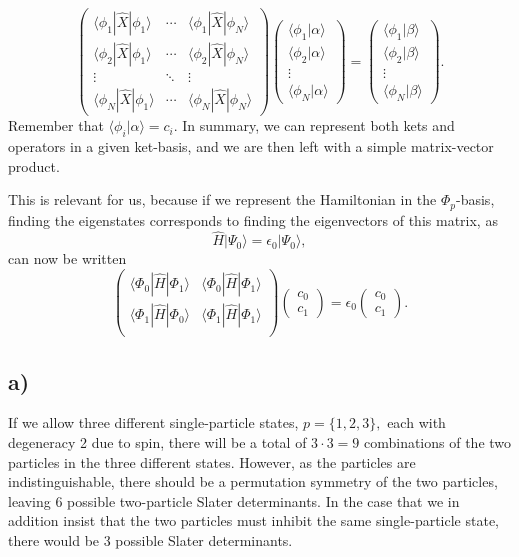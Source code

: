 \documentclass[a4paper, 11pt, notitlepage, english]{article}
\newcommand{\ket}[1]{|#1 \rangle}
\newcommand{\braket}[2]{\langle #1 | #2 \rangle}
\newcommand{\op}[1]{\hat{#1}}
\newcommand{\braopket}[3]{\langle #1 | {#2} | #3 \rangle}
\newcommand{\eps}{\epsilon}
\begin{document}
$$
\begin{pmatrix}
\braopket{\phi_1}{\op{X}}{\phi_1} & \cdots & \braopket{\phi_1}{\op{X}}{\phi_N} \\
\braopket{\phi_2}{\op{X}}{\phi_1} & \cdots & \braopket{\phi_2}{\op{X}}{\phi_N} 
\\
\vdots & \ddots & \vdots \\
\braopket{\phi_N}{\op{X}}{\phi_1} & \cdots & \braopket{\phi_N}{\op{X}}{\phi_N}
\end{pmatrix}
\begin{pmatrix}
\braket{\phi_1}{\alpha} \\
\braket{\phi_2}{\alpha} \\
\vdots \\
\braket{\phi_N}{\alpha}
\end{pmatrix}
=
\begin{pmatrix}
\braket{\phi_1}{\beta} \\
\braket{\phi_2}{\beta} \\
\vdots \\
\braket{\phi_N}{\beta}
\end{pmatrix}.
$$
Remember that $\braket{\phi_i}{\alpha} = c_i$. In summary, we can represent both kets and operators in a given ket-basis, and we are then left with a simple matrix-vector product.

This is relevant for us, because if we represent the Hamiltonian in the $\Phi_p$-basis, finding the eigenstates corresponds to finding the eigenvectors of this matrix, as
$$\op{H}\ket{\Psi_0} = \eps_0 \ket{\Psi_0},$$
can now be written
$$
\begin{pmatrix}
\braopket{\Phi_0}{\op{H}}{\Phi_1} & \braopket{\Phi_0}{\op{H}}{\Phi_1} \\
\braopket{\Phi_1}{\op{H}}{\Phi_0} & \braopket{\Phi_1}{\op{H}}{\Phi_1} \\
\end{pmatrix}
\begin{pmatrix}
    c_0 \\ c_1
\end{pmatrix} 
= \eps_0 \begin{pmatrix}
    c_0 \\ c_1
\end{pmatrix} 
.$$





\subsection*{a)}
If we allow three different single-particle states, $p=\{1,2,3\},$ each with degeneracy 2 due to spin, there will be a total of $3\cdot 3 = 9$ combinations of the two particles in the three different states. However, as the particles are indistinguishable, there should be a permutation symmetry of the two particles, leaving 6 possible two-particle Slater determinants. In the case that we in addition insist that the two particles must inhibit the same single-particle state, there would be 3 possible Slater determinants.
\end{document}
